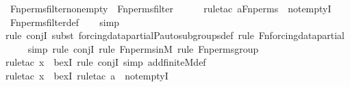 \begin{isabellebody}
\isamarkupfalse%
%
\endisatagproof
{\isafoldproof}%
%
\isadelimproof
\isanewline
%
\endisadelimproof
\isanewline
{}\isamarkupfalse%
\ Fn{\isacharunderscore}{\kern0pt}perms{\isacharunderscore}{\kern0pt}filter{\isacharunderscore}{\kern0pt}nonempty\ {\isacharcolon}{\kern0pt}\ {\isachardoublequoteopen}Fn{\isacharunderscore}{\kern0pt}perms{\isacharunderscore}{\kern0pt}filter\ {\isasymnoteq}\ {}{\isachardoublequoteclose}\ \isanewline
%
\isadelimproof
\ \ %
\endisadelimproof
%
\isatagproof
{}\isamarkupfalse%
{\isacharparenleft}{\kern0pt}rule{\isacharunderscore}{\kern0pt}tac\ a{\isacharequal}{\kern0pt}{\isachardoublequoteopen}Fn{\isacharunderscore}{\kern0pt}perms{\isachardoublequoteclose}\ \ not{\isacharunderscore}{\kern0pt}emptyI{\isacharparenright}{\kern0pt}\isanewline
\ \ \isamarkupfalse%
\ Fn{\isacharunderscore}{\kern0pt}perms{\isacharunderscore}{\kern0pt}filter{\isacharunderscore}{\kern0pt}def\isanewline
\ \ \isamarkupfalse%
\ simp\isanewline
\ \ \isamarkupfalse%
{\isacharparenleft}{\kern0pt}rule\ conjI{\isacharcomma}{\kern0pt}\ subst\ forcing{\isacharunderscore}{\kern0pt}data{\isacharunderscore}{\kern0pt}partial{\isachardot}{\kern0pt}P{\isacharunderscore}{\kern0pt}auto{\isacharunderscore}{\kern0pt}subgroups{\isacharunderscore}{\kern0pt}def{\isacharcomma}{\kern0pt}\ rule\ Fn{\isacharunderscore}{\kern0pt}forcing{\isacharunderscore}{\kern0pt}data{\isacharunderscore}{\kern0pt}partial{\isacharparenright}{\kern0pt}\isanewline
\ \ \ \isamarkupfalse%
\ {\isacharparenleft}{\kern0pt}simp{\isacharcomma}{\kern0pt}\ rule\ conjI{\isacharcomma}{\kern0pt}\ rule\ Fn{\isacharunderscore}{\kern0pt}perms{\isacharunderscore}{\kern0pt}in{\isacharunderscore}{\kern0pt}M{\isacharcomma}{\kern0pt}\ rule\ Fn{\isacharunderscore}{\kern0pt}perms{\isacharunderscore}{\kern0pt}group{\isacharparenright}{\kern0pt}\isanewline
\ \ \isamarkupfalse%
{\isacharparenleft}{\kern0pt}rule{\isacharunderscore}{\kern0pt}tac\ x{\isacharequal}{\kern0pt}{}\ \ bexI{\isacharcomma}{\kern0pt}\ rule\ conjI{\isacharcomma}{\kern0pt}\ simp\ add{\isacharcolon}{\kern0pt}finite{\isacharunderscore}{\kern0pt}M{\isacharunderscore}{\kern0pt}def{\isacharparenright}{\kern0pt}\isanewline
\ \ \ \ \isamarkupfalse%
{\isacharparenleft}{\kern0pt}rule{\isacharunderscore}{\kern0pt}tac\ x{\isacharequal}{\kern0pt}{}\ \ bexI{\isacharcomma}{\kern0pt}\ rule{\isacharunderscore}{\kern0pt}tac\ a{\isacharequal}{\kern0pt}{}\ \ not{\isacharunderscore}{\kern0pt}emptyI{\isacharparenright}{\kern0pt}\isanewline

\end{isabellebody}
